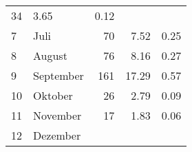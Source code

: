 \begin{longtable}{lXrrr}
       \num{34} &
       \num[round-mode=places,round-precision=2]{3,65} &
         \num[round-mode=places,round-precision=2]{0,12} \\

     7 &
     \multicolumn{1}{X}{ Juli   } &


       \num{70} &
       \num[round-mode=places,round-precision=2]{7,52} &
         \num[round-mode=places,round-precision=2]{0,25} \\

     8 &
     \multicolumn{1}{X}{ August   } &


       \num{76} &
       \num[round-mode=places,round-precision=2]{8,16} &
         \num[round-mode=places,round-precision=2]{0,27} \\

     9 &
     \multicolumn{1}{X}{ September   } &


       \num{161} &
       \num[round-mode=places,round-precision=2]{17,29} &
         \num[round-mode=places,round-precision=2]{0,57} \\

     10 &
     \multicolumn{1}{X}{ Oktober   } &


       \num{26} &
       \num[round-mode=places,round-precision=2]{2,79} &
         \num[round-mode=places,round-precision=2]{0,09} \\

     11 &
     \multicolumn{1}{X}{ November   } &


       \num{17} &
       \num[round-mode=places,round-precision=2]{1,83} &
         \num[round-mode=places,round-precision=2]{0,06} \\

     12 &
     \multicolumn{1}{X}{ Dezember   } &



\end{longtable}
